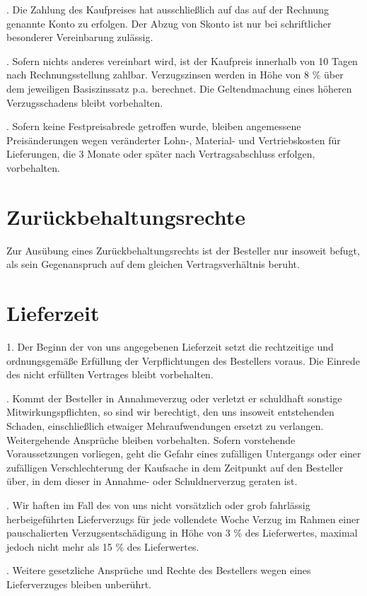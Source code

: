 \documentclass[a4paper, final, 12pt, oneside]{scrartcl}
\numberwithin{equation}{section}
\numberwithin{table}{section}
\numberwithin{figure}{section}
\begin{document}
\begin{multicols}{2}
. Die Zahlung des Kaufpreises hat ausschließlich auf das auf der Rechnung
genannte Konto zu erfolgen. Der Abzug von Skonto ist nur bei schriftlicher
besonderer Vereinbarung zulässig.

. Sofern nichts anderes vereinbart wird, ist der Kaufpreis innerhalb von
10 Tagen nach Rechnungsstellung zahlbar. Verzugszinsen werden in Höhe von
8 \% über dem jeweiligen Basiszinssatz p.a. berechnet. Die Geltendmachung
eines höheren Verzugsschadens bleibt vorbehalten.

. Sofern keine Festpreisabrede getroffen wurde, bleiben angemessene
Preisänderungen wegen veränderter Lohn-, Material- und Vertriebskosten für
Lieferungen, die 3 Monate oder später nach Vertragsabschluss erfolgen, vorbehalten.

\section{Zurückbehaltungsrechte}
Zur Ausübung eines Zurückbehaltungsrechts ist der Besteller nur insoweit
befugt, als sein Gegenanspruch auf dem gleichen Vertragsverhältnis beruht.

\section{Lieferzeit}
1. Der Beginn der von uns angegebenen Lieferzeit setzt die rechtzeitige
und ordnungsgemäße Erfüllung der Verpflichtungen des Bestellers voraus.
Die Einrede des nicht erfüllten Vertrages bleibt vorbehalten.

. Kommt der Besteller in Annahmeverzug oder verletzt er schuldhaft
sonstige Mitwirkungspflichten, so sind wir berechtigt, den uns insoweit
entstehenden Schaden, einschließlich etwaiger Mehraufwendungen ersetzt zu
verlangen. Weitergehende Ansprüche bleiben vorbehalten. Sofern vorstehende
Voraussetzungen vorliegen, geht die Gefahr eines zufälligen Untergangs
oder einer zufälligen Verschlechterung der Kaufsache in dem Zeitpunkt auf
den Besteller über, in dem dieser in Annahme- oder Schuldnerverzug geraten ist.

. Wir haften im Fall des von uns nicht vorsätzlich oder grob fahrlässig
herbeigeführten Lieferverzugs für jede vollendete Woche Verzug im Rahmen
einer pauschalierten Verzugsentschädigung in Höhe von 3 \% des Lieferwertes,
maximal jedoch nicht mehr als 15 \% des Lieferwertes.

. Weitere gesetzliche Ansprüche und Rechte des Bestellers wegen eines
Lieferverzuges bleiben unberührt.


\end{multicols}
\end{document}

